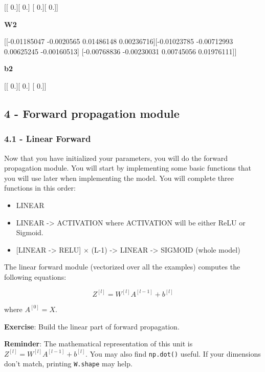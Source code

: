 \documentclass[11pt]{article}
\begin{document}
{[}{[} 0.{]}{[} 0.{]} {[} 0.{]}{[} 0.{]}{]}

\textbf{W2}

{[}{[}-0.01185047 -0.0020565 0.01486148 0.00236716{]}{[}-0.01023785
-0.00712993 0.00625245 -0.00160513{]} {[}-0.00768836 -0.00230031
0.00745056 0.01976111{]}{]}

\textbf{b2}

{[}{[} 0.{]}{[} 0.{]} {[} 0.{]}{]}

    \subsection{4 - Forward propagation
module}\label{forward-propagation-module}

\subsubsection{4.1 - Linear Forward}\label{linear-forward}

Now that you have initialized your parameters, you will do the forward
propagation module. You will start by implementing some basic functions
that you will use later when implementing the model. You will complete
three functions in this order:

\begin{itemize}
\itemsep1pt\parskip0pt
\item
  LINEAR
\item
  LINEAR -\textgreater{} ACTIVATION where ACTIVATION will be either ReLU
  or Sigmoid.
\item
  {[}LINEAR -\textgreater{} RELU{]} $\times$ (L-1) -\textgreater{}
  LINEAR -\textgreater{} SIGMOID (whole model)
\end{itemize}

The linear forward module (vectorized over all the examples) computes
the following equations:

\[Z^{[l]} = W^{[l]}A^{[l-1]} +b^{[l]}\tag{4}\]

where $A^{[0]} = X$.

\textbf{Exercise}: Build the linear part of forward propagation.

\textbf{Reminder}: The mathematical representation of this unit is
$Z^{[l]} = W^{[l]}A^{[l-1]} +b^{[l]}$. You may also find
\texttt{np.dot()} useful. If your dimensions don't match, printing
\texttt{W.shape} may help.
\end{document}
